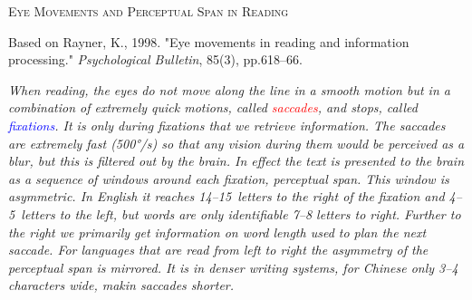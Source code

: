 \documentclass{article}
\def\fixcolor{blue}
\def\saccolor{red}
\begin{document}
\centerline{\Huge 
\scshape Eye Movements and Perceptual Span in Reading
}

\medskip
\centerline{Based on Rayner, K., 1998. "Eye movements in reading and information processing."  \textit{Psychological Bulletin}, 85(3), pp.618--66.}

\vfill



\begin{multicols}{3}
  \setlength\parfillskip{0pt}
  \setlength\emergencystretch{40pt}
\itshape
When reading, the eyes do not move along the line in a smooth motion but in a combination of extremely quick motions, called \textcolor{\saccolor}{\mbox{saccades}}, and stops, called \textcolor{\fixcolor}{\mbox{fixations}}. It is only during fixations that we retrieve information. The saccades are extremely fast (500°/s) so that any vision during them would be perceived as a blur, but this is filtered out by the brain. In effect the text is presented to the brain as a sequence of windows around each fixation, \textit{perceptual span}. This window is asymmetric. In English it reaches 14--15~letters to the right of the fixation and 4--5~letters to the left, but words are only identifiable 7--8 letters to right. Further to the right we primarily get information on word length used to plan the next saccade. For languages that are read from left to right the asymmetry of the perceptual span is mirrored. It is in denser writing systems, for Chinese only 3--4 characters wide, makin saccades shorter. 
\end{multicols}

\vfill

\vspace{3cm}
\end{document}
